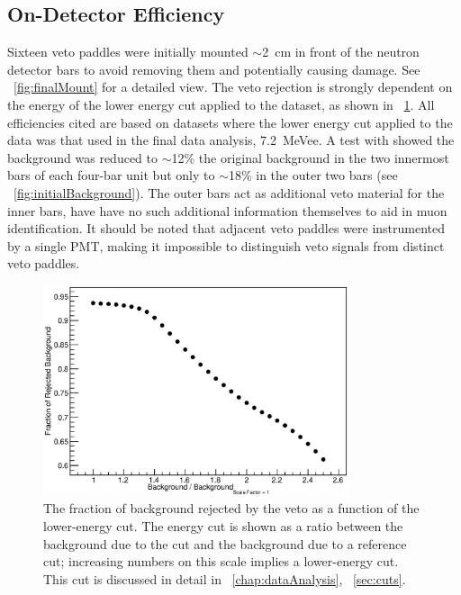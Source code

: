\subsection{On-Detector Efficiency}

Sixteen veto paddles were initially mounted $\sim$2~cm in front of the neutron detector bars to avoid removing them and potentially causing damage.  See {\fig}~\ref{fig:finalMount} for a detailed view.  The veto rejection is strongly dependent on the energy of the lower energy cut applied to the dataset, as shown in {\fig}~\ref{fig:vetoRejection_vs_energyCut}.  All efficiencies cited are based on datasets where the lower energy cut applied to the data was that used in the final data analysis, 7.2~MeVee.  A test with \MgReaction showed the background was reduced to $\sim$12\% the original background in the two innermost bars of each four-bar unit but only to $\sim$18\% in the outer two bars (see {\fig}~\ref{fig:initialBackground}).  The outer bars act as additional veto material for the inner bars, have have no such additional information themselves to aid in muon identification.  It should be noted that adjacent veto paddles were instrumented by a single PMT, making it impossible to distinguish veto signals from distinct veto paddles.  
\begin{figure}[!htbp]
\centering
\includegraphics[width=0.8\textwidth]{figures/vetoEfficiency_functionOfCut.eps}
\caption[Dependence of the veto efficiency on the lower-energy cut.]{The fraction of background rejected by the veto as a function of the lower-energy cut.  The energy cut is shown as a ratio between the background due to the cut and the background due to a reference cut; increasing numbers on this scale implies a lower-energy cut.  This cut is discussed in detail in {\chap}~\ref{chap:dataAnalysis}, {\sect}~\ref{sec:cuts}.}
\label{fig:vetoRejection_vs_energyCut}
\end{figure}
